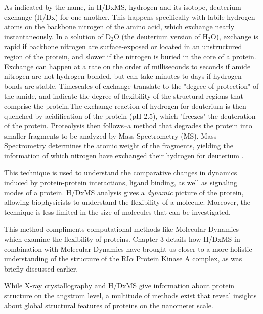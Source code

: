 \documentclass[12pt]{ucsddissertation}
\begin{document}
\begin{dissertationintroduction}
As indicated by the name, in H/DxMS, hydrogen and its isotope, deuterium exchange (H/Dx) for one another. This happens specifically with labile hydrogen atoms on the backbone nitrogen of the amino acid, which exchange nearly instantaneously. In a solution of D$_{2}$O (the deuterium version of H$_{2}$O), exchange is rapid if backbone nitrogen are surface-exposed or located in an unstructured region of the protein, and slower if the nitrogen is buried in the core of a protein. Exchange can happen at a rate on the order of milliseconds to seconds if amide nitrogen are not hydrogen bonded, but can take minutes to days if hydrogen bonds are stable. Timescales of exchange translate to the "degree of protection" of the amide, and indicate the degree of flexibility of the structural regions that comprise the protein.The exchange reaction of hydrogen for deuterium is then quenched by acidification of the protein (pH 2.5), which "freezes" the deuteration of the protein. Proteolysis then follows--a method that degrades the protein into smaller fragments to be analyzed by Mass Spectrometry (MS). Mass Spectrometry determines the atomic weight of the fragments, yielding the information of which nitrogen have exchanged their hydrogen for deuterium \cite{Konermann2011}. 

This technique is used to understand the comparative changes in dynamics induced by protein-protein interactions, ligand binding, as well as signaling modes of a protein\cite{Harrison2016}. H/DxMS analysis gives a \textit{dynamic} picture of the protein, allowing biophysicists to understand the flexibility of a molecule. Moreover, the technique is less limited in the size of molecules that can be investigated. 

This method compliments computational methods like Molecular Dynamics which examine the flexibility of proteins. Chapter 3 details how H/DxMS in combination with Molecular Dynamics have brought us closer to a more holistic understanding of the structure of the RI$\alpha$ Protein Kinase A complex, as was briefly discussed earlier. 

While X-ray crystallography and H/DxMS give information about protein structure on the angstrom level, a multitude of methods exist that reveal insights about global structural features of proteins on the nanometer scale.


\end{dissertationintroduction}
\end{document}
